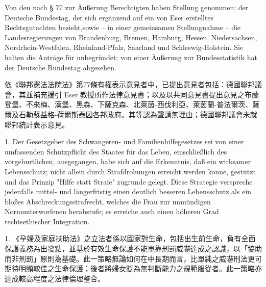 \documentclass[12pt]{article}
\begin{document}

\begin{sourcepara}[title={原文C.14}]
Von den nach § 77 \abbrBVerfGG{} zur Äußerung Berechtigten haben Stellung genommen: der Deutsche Bundestag, der sich ergänzend auf ein von \abbrProf{} \abbrDr{} Eser erstelltes Rechtsgutachten bezieht,sowie -- in einer gemeinsamen Stellungnahme -- die Landesregierungen von Brandenburg, Bremen, Hamburg, Hessen, Niedersachsen, Nordrhein-Westfalen, Rheinland-Pfalz, Saarland und Schleswig-Holstein. Sie halten die Anträge für unbegründet; von einer Äußerung zur Bundesstatistik hat der Deutsche Bundestag abgesehen.
\end{sourcepara}
\begin{transpara}
依《聯邦憲法法院法》第77條有權表示意見者中，已提出意見者包括：德國聯邦議會，其並補充援引 Eser 教授所作法律意見書；以及以共同意見書提出意見之布蘭登堡、不來梅、漢堡、黑森、下薩克森、北萊茵-西伐利亞、萊茵蘭-普法爾茨、薩爾及石勒蘇益格-荷爾斯泰因各邦政府。其等認為聲請無理由；德國聯邦議會未就聯邦統計表示意見。
\end{transpara}

\begin{sourcepara}[title={原文C.15}]
1. Der Gesetzgeber des Schwangeren- und Familienhilfegesetzes sei von einer umfassenden Schutzpflicht des Staates für das Leben, einschließlich des vorgeburtlichen, ausgegangen, habe sich auf die Erkenntnis, daß ein wirksamer Lebensschutz; nicht allein durch Strafdrohungen erreicht werden könne, gestützt und das Prinzip "Hilfe statt Strafe" zugrunde gelegt. Diese Strategie verspreche jedenfalls mittel- und längerfristig einen deutlich besseren Lebensschutz als ein bloßes Abschreckungsstrafrecht, welches die Frau zur unmündigen Normunterworfenen herabstufe; es erreiche auch einen höheren Grad rechtsethischer Integration.
\end{sourcepara}
\begin{transpara}
1. 《孕婦及家庭扶助法》之立法者係以國家對生命，包括出生前生命，負有全面保護義務為出發點，並基於有效生命保護不能單靠刑罰威嚇達成之認識，以「協助而非刑罰」原則為基礎。此一策略無論如何在中長期而言，比單純之威嚇刑法更可期待明顯較佳之生命保護；後者將婦女貶為無判斷能力之規範服從者。此一策略亦達成較高程度之法律倫理整合。
\end{transpara}
\end{document}
